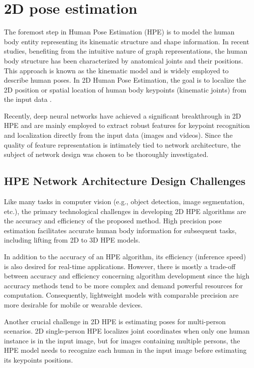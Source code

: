 \section{2D pose estimation}
The foremost step in Human Pose Estimation (HPE) is to model the human body entity representing its kinematic structure and shape information. In recent studies, benefiting from the intuitive nature of graph representations, the human body structure has been characterized by anatomical joints and their positions. This approach is known as the kinematic model and is widely employed to describe human poses. In 2D Human Pose Estimation, the goal is to localize the 2D position or spatial location of human body keypoints (kinematic joints) from the input data \cite{rafi_efficient_2016}.

Recently, deep neural networks have achieved a significant breakthrough in 2D HPE and are mainly employed to extract robust features for keypoint recognition and localization directly from the input data (images and videos). Since the quality of feature representation is intimately tied to network architecture, the subject of network design was chosen to be thoroughly investigated. 

\subsection*{HPE Network Architecture Design Challenges}

Like many tasks in computer vision (e.g., object detection, image segmentation, etc.), the primary technological challenges in developing 2D HPE algorithms are the accuracy and efficiency of the proposed method. High precision pose estimation facilitates accurate human body information for subsequent tasks, including lifting from 2D to 3D HPE models. 

In addition to the accuracy of an HPE algorithm, its efficiency (inference speed) is also desired for real-time applications. However, there is mostly a trade-off between accuracy and efficiency concerning algorithm development since the high accuracy methods tend to be more complex and demand powerful resources for computation. Consequently, lightweight models with comparable precision are more desirable for mobile or wearable devices. 

Another crucial challenge in 2D HPE is estimating poses for multi-person scenarios. 2D single-person HPE localizes joint coordinates when only one human instance is in the input image, but for images containing multiple persons, the HPE model needs to recognize each human in the input image before estimating its keypoints positions. 

